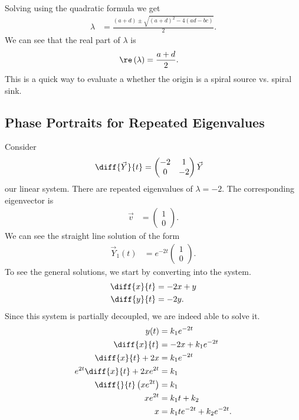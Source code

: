 \documentclass[10pt]{mypackage}
\begin{document}
Solving using the quadratic formula we get
\begin{align*}
  \lambda &= \frac{\left(a+d\right) \pm \sqrt{\left(a+d\right)^2 - 4\left(ad-bc\right)}}{2}.
\end{align*}
We can see that the real part of $\lambda$ is
\begin{align*}
  \re\left(\lambda\right) &= \frac{a+d}{2}.
\end{align*}
This is a quick way to evaluate a whether the origin is a spiral source vs. spiral sink.
\subsection{Phase Portraits for Repeated Eigenvalues}%
Consider
\begin{align*}
  \diff{\vec{Y}}{t} &= \begin{pmatrix}-2 & 1 \\ 0 & -2\end{pmatrix} \vec{Y}
\end{align*}
our linear system. There are repeated eigenvalues of $\lambda = -2$. The corresponding eigenvector is
\begin{align*}
  \vec{v} &= \begin{pmatrix}1\\0\end{pmatrix}.
\end{align*}
We can see the straight line solution of the form
\begin{align*}
  \vec{Y}_1(t) &= e^{-2t} \begin{pmatrix}1\\0\end{pmatrix}.
\end{align*}
To see the general solutions, we start by converting into the system.
\begin{align*}
  \diff{x}{t} &= -2x + y\\
  \diff{y}{t} &= -2y.
\end{align*}
Since this system is partially decoupled, we are indeed able to solve it.
\begin{align*}
  y(t) &= k_1e^{-2t}\\
  \diff{x}{t} &= -2x + k_1e^{-2t}\\
  \diff{x}{t} + 2x &= k_1e^{-2t}\\
  e^{2t}\diff{x}{t} + 2xe^{2t} &= k_1\\
  \diff{}{t}\left(xe^{2t}\right) &= k_1\\
  xe^{2t} &= k_1t + k_2\\
  x &= k_1te^{-2t} + k_2e^{-2t}.
\end{align*}
\end{document}
